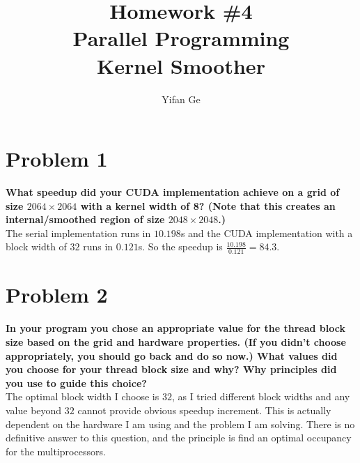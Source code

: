 \documentclass[letterpaper, 11pt]{article}
\begin{document}
\title{Homework \#4 \\ Parallel Programming \\Kernel Smoother}
\author{Yifan Ge}

\maketitle
\section*{Problem 1}
\textbf{What speedup did your CUDA implementation achieve on a grid of size $2064 \times 2064$ with a kernel width of 8? (Note that this creates an internal/smoothed region of size $2048 \times 2048$.)}\\
The serial implementation runs in $10.198$s and the CUDA implementation with a block width of $32$ runs in $0.121$s. So the speedup is $\frac{10.198}{0.121}=84.3$.

\section*{Problem 2}
\textbf{In your program you chose an appropriate value for the thread block size based on the grid and hardware properties. (If you didn't choose appropriately, you should go back and do so now.) What values did you choose for your thread block size and why? Why principles did you use to guide this choice?}\\
The optimal block width I choose is $32$, as I tried different block widths and any value beyond $32$ cannot provide obvious speedup increment. This is actually dependent on the hardware I am using and the problem I am solving. There is no definitive answer to this question, and the principle is find an optimal occupancy for the multiprocessors.
\end{document}
